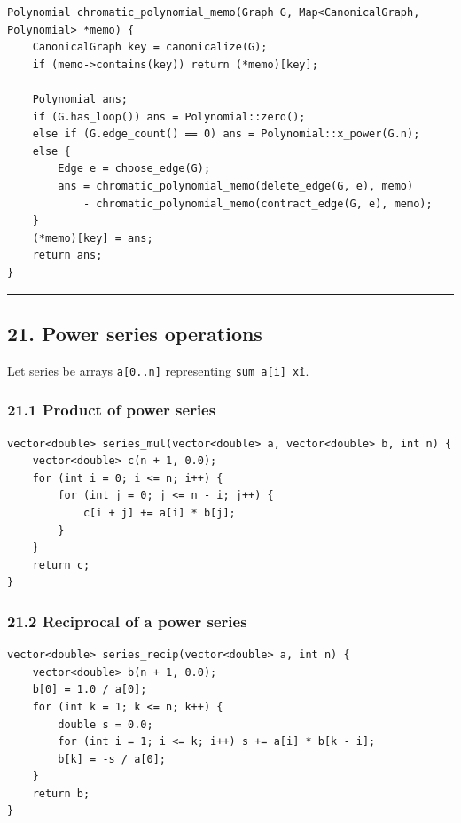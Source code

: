 \documentclass[11pt]{article}
\begin{document}
\begin{verbatim}
Polynomial chromatic_polynomial_memo(Graph G, Map<CanonicalGraph, Polynomial> *memo) {
    CanonicalGraph key = canonicalize(G);
    if (memo->contains(key)) return (*memo)[key];

    Polynomial ans;
    if (G.has_loop()) ans = Polynomial::zero();
    else if (G.edge_count() == 0) ans = Polynomial::x_power(G.n);
    else {
        Edge e = choose_edge(G);
        ans = chromatic_polynomial_memo(delete_edge(G, e), memo)
            - chromatic_polynomial_memo(contract_edge(G, e), memo);
    }
    (*memo)[key] = ans;
    return ans;
}
\end{verbatim}

\begin{center}\rule{0.5\linewidth}{0.5pt}\end{center}

\subsection{21. Power series operations}\label{power-series-operations}

Let series be arrays \texttt{a[0..n]} representing \texttt{sum a[i] x\^i}.

\subsubsection{21.1 Product of power series}\label{product-of-power-series}

\begin{verbatim}
vector<double> series_mul(vector<double> a, vector<double> b, int n) {
    vector<double> c(n + 1, 0.0);
    for (int i = 0; i <= n; i++) {
        for (int j = 0; j <= n - i; j++) {
            c[i + j] += a[i] * b[j];
        }
    }
    return c;
}
\end{verbatim}

\subsubsection{21.2 Reciprocal of a power series}\label{reciprocal-of-a-power-series}

\begin{verbatim}
vector<double> series_recip(vector<double> a, int n) {
    vector<double> b(n + 1, 0.0);
    b[0] = 1.0 / a[0];
    for (int k = 1; k <= n; k++) {
        double s = 0.0;
        for (int i = 1; i <= k; i++) s += a[i] * b[k - i];
        b[k] = -s / a[0];
    }
    return b;
}
\end{verbatim}
\end{document}
